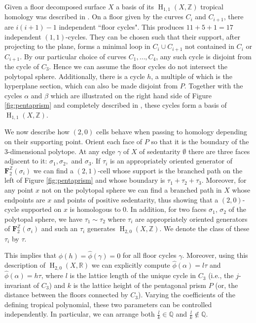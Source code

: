 \documentclass[11pt]{article}
\numberwithin{equation}{numsection}
\newcommand{\Z}{{\mathbb Z}}
\newcommand{\R}{{\mathbb R}}
\DeclareMathOperator{\HH}{H}
\begin{document}
\begin{example}
{\begin{figure}
\vspace{7cm}
\end{figure}

Given a floor decomposed surface $X$  a basis of its $\HH_{1, 1}(X, \Z)$ tropical homology 
was described in \cite{Shaw:11Homol}. 
On a floor given by the curves $C_{i}$ and $C_{i+1}$, there are $i(i+1) -1$
independent ``floor cycles". 
This produces $11 + 5 + 1 = 17$ independent $(1, 1)$-cycles. 
They can be chosen such that their support, after projecting to the plane,
forms a minimal loop in $C_{i} \cup C_{i+1}$ not contained in $C_{i}$ or $C_{i+1}$.
By our particular choice of curves $C_1, \dots, C_4$, any such cycle is disjoint from the cycle of $C_3$.
Hence we can assume the floor cycles do not intersect the polytopal sphere. 
Additionally, there is a cycle $h$, a multiple of which is the hyperplane section, 
which can also be made disjoint from $P$.
Together with the cycles $\alpha$ and $\beta$ which are illustrated on the right hand side of Figure \ref{fig:pentaprism}  and 
completely described in \cite{Shaw:11Homol}, these cycles form a basis of $\HH_{1,1}(X, \Z)$. 


We now describe how $(2,0)$ cells behave when passing to homology depending on their supporting point.
Orient each face of $P$ so that it is the boundary of the $3$-dimensional polytope. 
At any edge $\gamma$ of $X$ of sedentarity $\emptyset$ there are three faces adjacent to it: 
$\sigma_1, \sigma_2, $ and $\sigma_3$. 
If $\tau_i $ is an appropriately oriented generator of $\mathbf{F}_2^\Z(\sigma_i)$ 
we can find a $(2, 1)$-cell whose support is the branched path on the left of Figure \ref{fig:pentaprism} and 
whose boundary is  $\tau_1 + \tau_2 +  \tau_3$.  
Moreover, for  any point $x$ not on the polytopal sphere we can find a branched path in $X$ 
whose endpoints are $x$ and points of positive sedentarity, thus showing that a $(2, 0)$-cycle supported on $x$ is homologous to $0$. 
In addition, for two faces $\sigma_1$, $\sigma_2$ of the polytopal sphere, we have $\tau_1 \sim \tau_2$ 
where $\tau_i$ are appropriately oriented generators of $\mathbf{F}_2^\Z(\sigma_i)$ and 
such an $\tau_i$ generates $\HH_{2,0}(X, \Z)$.  
We denote the class of these $\tau_i$ by $\tau$. 



This implies that $\hat{\phi}(h) = \hat{\phi}(\gamma) =0$ for all floor cycles $\gamma$. 
Moreover, using this description of $\HH_{2,0}(X, \R)$ we can explicitly compute
$\hat{\phi}(\alpha) = l \tau$ and $\hat{\phi}(\alpha) = h \tau$, where
$l$ is the lattice length of the unique cycle in $C_3$
(i.e., the $j$-invariant of $C_3$)
and $k$ is the lattice height 
of the pentagonal prism $P$
(or, the distance between the floors connected by $C_3$). 
Varying the coefficients of the defining tropical polynomial, these two parameters can be
controlled independently. In particular, we can arrange both
$\frac{l}{k} \in \mathbb{Q}$ and $\frac{l}{k} \notin \mathbb{Q}$.





}
\end{example}
\end{document}
